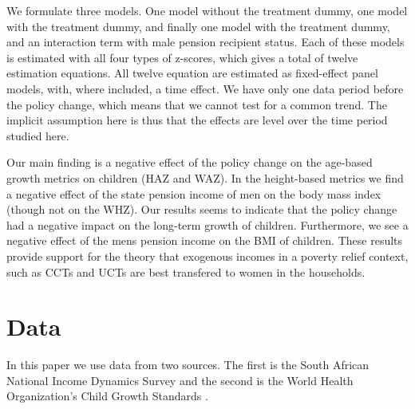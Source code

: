 \begin{refsection}
We formulate three models. One model without the treatment dummy,
one model with the treatment dummy, and finally one model with the treatment dummy,
and an interaction term with male pension recipient status.
Each of these models is estimated with all four types of z-scores,
which gives a total of twelve estimation equations.
All twelve equation are estimated as fixed-effect panel models, with, where included, a time effect.
We have only one data period before the policy change, which means that we cannot test for a common trend.
The implicit assumption here is thus that the effects are level over the time period studied here.

Our main finding is a negative effect of the policy change on the age-based growth metrics on children (HAZ and WAZ).
In the height-based metrics we find a negative effect of the state pension income of men on the body mass index (though not on the WHZ).
Our results seems to indicate that the policy change had a negative impact on the long-term growth of children.
Furthermore, we see a negative effect of the mens pension income on the BMI of children.
These results provide support for the theory that exogenous incomes in a poverty relief context,
such as CCTs and UCTs are best transfered to women in the households.

\section{Data}
\label{sa:data}
In this paper we use data from two sources.
The first is the South African National Income Dynamics Survey \parencite[NIDS][]{saldru2008nids, saldru2012nids, saldru2013nids} and the second is the World Health Organization's Child Growth Standards \parencite[WHO]{who2006child}.


\end{refsection}
